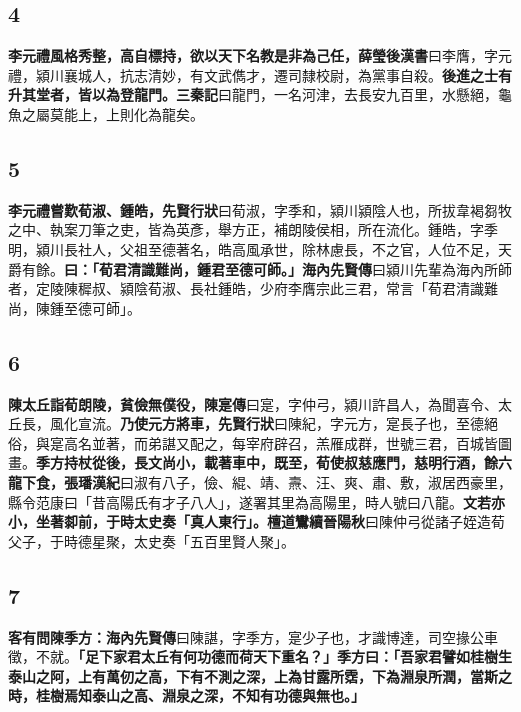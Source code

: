 \subsection*{4}

\textbf{李元禮風格秀整，高自標持，欲以天下名教是非為己任，}{\footnotesize \textbf{薛瑩後漢書}曰李膺，字元禮，潁川襄城人，抗志清妙，有文武儁才，遷司隸校尉，為黨事自殺。}\textbf{後進之士有升其堂者，皆以為登龍門。}{\footnotesize \textbf{三秦記}曰龍門，一名河津，去長安九百里，水懸絕，龜魚之屬莫能上，上則化為龍矣。}

\subsection*{5}

\textbf{李元禮嘗歎荀淑、鍾皓，}{\footnotesize \textbf{先賢行狀}曰荀淑，字季和，潁川潁陰人也，所拔韋褐芻牧之中、執案刀筆之吏，皆為英彥，舉方正，補朗陵侯相，所在流化。鍾皓，字季明，潁川長社人，父祖至德著名，皓高風承世，除林慮長，不之官，人位不足，天爵有餘。}\textbf{曰：「荀君清識難尚，鍾君至德可師。」}{\footnotesize \textbf{海內先賢傳}曰潁川先輩為海內所師者，定陵陳穉叔、潁陰荀淑、長社鍾皓，少府李膺宗此三君，常言「荀君清識難尚，陳鍾至德可師」。}

\subsection*{6}

\textbf{陳太丘詣荀朗陵，貧儉無僕役，}{\footnotesize \textbf{陳寔傳}曰寔，字仲弓，潁川許昌人，為聞喜令、太丘長，風化宣流。}\textbf{乃使元方將車，}{\footnotesize \textbf{先賢行狀}曰陳紀，字元方，寔長子也，至德絕俗，與寔高名並著，而弟諶又配之，每宰府辟召，羔雁成群，世號三君，百城皆圖畫。}\textbf{季方持杖從後，長文尚小，載著車中，既至，荀使叔慈應門，慈明行酒，餘六龍下食，}{\footnotesize \textbf{張璠漢紀}曰淑有八子，儉、緄、靖、燾、汪、爽、肅、敷，淑居西豪里，縣令范康曰「昔高陽氏有才子八人」，遂署其里為高陽里，時人號曰八龍。}\textbf{文若亦小，坐著厀前，于時太史奏「真人東行」。}{\footnotesize \textbf{檀道鸞續晉陽秋}曰陳仲弓從諸子姪造荀父子，于時德星聚，太史奏「五百里賢人聚」。}

\subsection*{7}

\textbf{客有問陳季方：}{\footnotesize \textbf{海內先賢傳}曰陳諶，字季方，寔少子也，才識博達，司空掾公車徵，不就。}\textbf{「足下家君太丘有何功德而荷天下重名？」季方曰：「吾家君譬如桂樹生泰山之阿，上有萬仞之高，下有不測之深，上為甘露所霑，下為淵泉所潤，當斯之時，桂樹焉知泰山之高、淵泉之深，不知有功德與無也。」}

